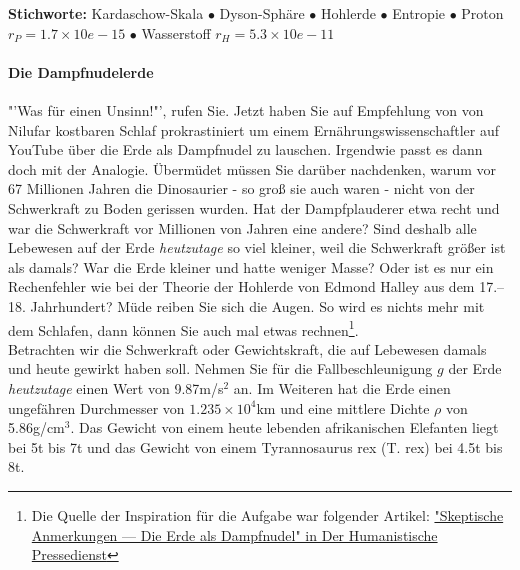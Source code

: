 \documentclass[a4paper, 9pt]{scrartcl}\usepackage[]{graphicx}\usepackage[]{xcolor}
\begin{document}
{\tiny\textbf{Stichworte:} Kardaschow-Skala $\bullet$ Dyson-Sphäre $\bullet$ Hohlerde $\bullet$ Entropie $\bullet$ Proton $r_P = 1.7 \times 10e-15$ $\bullet$ Wasserstoff $r_H = 5.3\times 10e-11$}

\ifcollection
\paragraph{Die Dampfnudelerde}
\fi



"'Was für einen Unsinn!"', rufen Sie. Jetzt haben Sie auf Empfehlung von von Nilufar kostbaren Schlaf prokrastiniert um einem Ernährungswissenschaftler auf YouTube über die Erde als Dampfnudel zu lauschen. Irgendwie passt es dann doch mit der Analogie. Übermüdet müssen Sie darüber nachdenken, warum vor 67 Millionen Jahren die Dinosaurier - so groß sie auch waren - nicht von der Schwerkraft zu Boden gerissen wurden. Hat der Dampfplauderer etwa recht und war die Schwerkraft vor Millionen von Jahren eine andere?  Sind deshalb alle Lebewesen auf der Erde \textit{heutzutage} so viel kleiner, weil die Schwerkraft größer ist als damals? War die Erde kleiner und hatte weniger Masse? Oder ist es nur ein Rechenfehler wie bei der Theorie der Hohlerde von Edmond Halley aus dem 17.–18. Jahrhundert? Müde reiben Sie sich die Augen. So wird es nichts mehr mit dem Schlafen, dann können Sie auch mal etwas rechnen\footnote{Die Quelle der Inspiration
  für die Aufgabe war folgender Artikel:
  \href{https://hpd.de/artikel/erde-dampfnudel-22236}{"Skeptische Anmerkungen --- Die Erde als Dampfnudel" in Der Humanistische Pressedienst}}.  \\

Betrachten wir die Schwerkraft oder Gewichtskraft, die auf Lebewesen damals und heute gewirkt haben soll. Nehmen Sie für die Fallbeschleunigung $g$ der Erde \textit{heutzutage} einen Wert von 9.87m/s$^2$ an. Im Weiteren hat die Erde einen ungefähren Durchmesser von \ensuremath{1.235\times 10^{4}}km und eine mittlere Dichte $\rho$ von 5.86g/cm$^3$. Das Gewicht von einem heute lebenden afrikanischen Elefanten liegt bei 5t bis 7t und das Gewicht von einem Tyrannosaurus rex (T. rex) bei 4.5t bis 8t.
\end{document}
